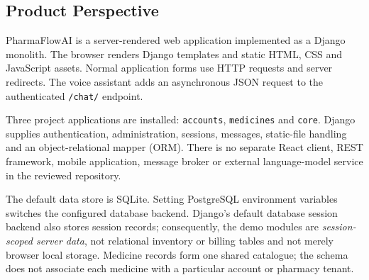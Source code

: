 \documentclass{article}
\newcommand{\Project}{PharmaFlowAI}
\begin{document}
\subsection{Product Perspective}
\Project{} is a server-rendered web application implemented as a Django monolith. The browser renders Django templates and static HTML, CSS and JavaScript assets. Normal application forms use HTTP requests and server redirects. The voice assistant adds an asynchronous JSON request to the authenticated \texttt{/chat/} endpoint.

Three project applications are installed: \texttt{accounts}, \texttt{medicines} and \texttt{core}. Django supplies authentication, administration, sessions, messages, static-file handling and an object-relational mapper (ORM). There is no separate React client, REST framework, mobile application, message broker or external language-model service in the reviewed repository.

The default data store is SQLite. Setting PostgreSQL environment variables switches the configured database backend. Django's default database session backend also stores session records; consequently, the demo modules are \emph{session-scoped server data}, not relational inventory or billing tables and not merely browser local storage. Medicine records form one shared catalogue; the schema does not associate each medicine with a particular account or pharmacy tenant.
\end{document}
